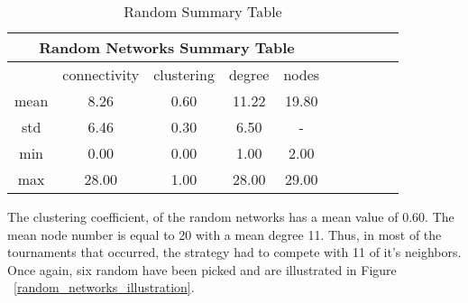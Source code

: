 \begin{table}[!hbtp]
	\centering
	\begin{adjustbox}{width=0.5\textwidth}
		\small
		\begin{tabular}{cccccccccc}
				\toprule
			\multicolumn{5}{|c|}{Random Networks Summary Table}                       \\ \hline
			     & connectivity & clustering & degree & nodes                  \\ \hline
			mean & 8.26         & 0.60       & 11.22  & 19.80                  \\ \hline
			std  & 6.46         & 0.30       & 6.50   & \multicolumn{1}{c}{-} \\ \hline
			min  & 0.00         & 0.00       & 1.00   & 2.00                   \\ \hline
			max  & 28.00        & 1.00       & 28.00  & 29.00                  \\ \bottomrule
		\end{tabular}
	\end{adjustbox}
	\caption{Random Summary Table}
	\label{table:binomial-summary-table}
\end{table}

The clustering coefficient, of the random networks has a mean value of 0.60. The
mean node number is equal to 20 with a mean degree 11. Thus, in most of the
tournaments that occurred, the strategy had to compete with 11 of it's neighbors.
Once again, six random have been picked and are illustrated in Figure ~\ref{random_networks_illustration}.

